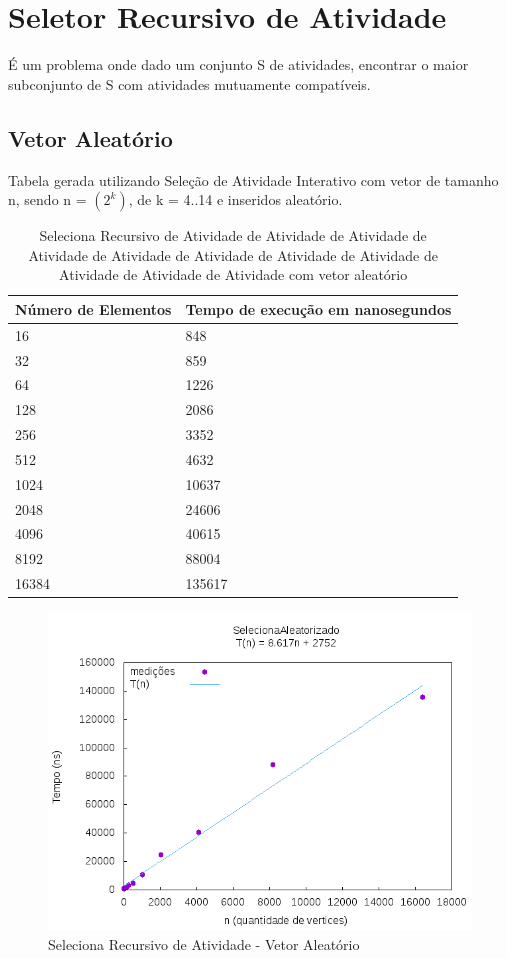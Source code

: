 \documentclass[12pt,a4paper,twoside]{report}
\begin{document}
\section{Seletor Recursivo de Atividade}

É um problema onde dado um conjunto S de atividades, encontrar o maior subconjunto de S com
atividades mutuamente compatíveis.

\subsection{Vetor Aleatório}
Tabela gerada utilizando Seleção de Atividade Interativo com vetor de tamanho n, sendo n = $(2^k)$, de k = 4..14 e inseridos aleatório.
\begin{table}[H]
\centering
\caption{Seleciona Recursivo de Atividade de Atividade de Atividade de Atividade de Atividade de Atividade de Atividade de Atividade de Atividade de Atividade de Atividade com vetor aleatório}
\label{my-label}
\begin{tabular}{|l|l|}
\hline
\multicolumn{1}{|c|}{\textbf{Número de Elementos}} & \multicolumn{1}{c|}{\textbf{Tempo de execução em nanosegundos}} \\ \hline
16 & 848 \\ \hline
32 & 859 \\ \hline
64 & 1226 \\ \hline
128 & 2086 \\ \hline
256 & 3352 \\ \hline
512 & 4632 \\ \hline
1024 & 10637 \\ \hline
2048 & 24606 \\ \hline
4096 & 40615 \\ \hline
8192 & 88004 \\ \hline
16384 & 135617 \\ \hline

\end{tabular}
\end{table}

\begin{figure}[H]
    \centering
    \includegraphics[width=0.7\linewidth]{graficos/SeletorRecursivoAtividades/Aleatorio/SelecionaAleatorizado.png}
  \caption{Seleciona Recursivo de Atividade - Vetor Aleatório}
\end{figure}
\end{document}
